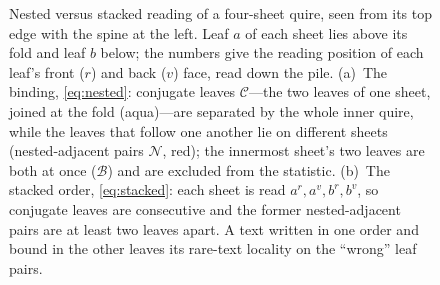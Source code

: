 \documentclass[11pt,a4paper]{article}
\newcommand{\qpitch}{0.6}      %
\newcommand{\qarm}{1.9}        %
\newcommand{\qband}{5pt}       %
\newcommand{\qleaf}[4]{%
  \pgfmathsetmacro{\y}{-#1*\qpitch}
  \pgfmathtruncatemacro{\pv}{#4+1}
  \node[anchor=south,font=\sffamily\tiny,color=ink2,inner sep=0.5pt] at (\qarm-0.16,\y+0.09) {#4};
  \node[anchor=north,font=\sffamily\tiny,color=muted,inner sep=0.5pt] at (\qarm-0.52,\y-0.09) {\pv};
  \node[anchor=west,font=\sffamily\scriptsize,color=black!80] at (\qarm+0.08,\y) {#2$#3$};
  \coordinate (leaf#2#3) at (\qarm+0.55,\y);
}
\newcommand{\qsheet}[3]{%
  \pgfmathsetmacro{\r}{(#1-#2)/2}
  \draw[line width=\qband,#3,line cap=butt] (\qarm,#1) -- (0,#1) arc[start angle=90,end angle=270,radius=\r] -- (\qarm,#2);
}
\newcommand{\qnested}[1]{%
  \foreach \s in {1,...,#1}{
    \pgfmathtruncatemacro{\ia}{\s-1}\pgfmathtruncatemacro{\ib}{2*#1-\s}
    \qsheet{-\ia*\qpitch}{-\ib*\qpitch}{sheet\s}
    \pgfmathtruncatemacro{\pa}{2*\ia+1}\pgfmathtruncatemacro{\pb}{2*\ib+1}
    \qleaf{\ia}{\s}{a}{\pa}\qleaf{\ib}{\s}{b}{\pb}
  }
}
\newcommand{\qstacked}[1]{%
  \foreach \s in {1,...,#1}{
    \pgfmathtruncatemacro{\ia}{2*\s-2}\pgfmathtruncatemacro{\ib}{2*\s-1}
    \qsheet{-\ia*\qpitch}{-\ib*\qpitch}{sheet\s}
    \pgfmathtruncatemacro{\pa}{2*\ia+1}\pgfmathtruncatemacro{\pb}{2*\ib+1}
    \qleaf{\ia}{\s}{a}{\pa}\qleaf{\ib}{\s}{b}{\pb}
  }
}
\newcommand{\qreadarrow}[1]{%
  \pgfmathsetmacro{\yb}{-(#1-1)*\qpitch-0.22}
  \draw[->,muted,>={Stealth[length=3pt]},line width=0.5pt] (\qarm+0.62,0.22) -- (\qarm+0.62,\yb);
  \node[anchor=north west,color=ink2,font=\sffamily\tiny,align=left,inner sep=1pt] at (\qarm+0.5,\yb-0.02) {reading order};
}
\newcommand{\qfoldmark}[2]{%
  \draw[stackedc,line width=1.1pt] (0,#1+#2) arc[start angle=90,end angle=270,radius=#2];
}
\newcommand{\qfoldlabel}[3]{%
  \node[anchor=north west,align=left,font=\sffamily\tiny,color=stackedc!80!black,text width=3.1cm,inner sep=1pt] at (#1,#2) {#3};
}
\newcommand{\qbracket}[6]{%
  \draw[#3,line width=0.9pt] ($(#1)+(#4,0.13)$) -- ($(#1)+(#4+0.12,0.13)$) -- ($(#2)+(#4+0.12,-0.13)$) -- ($(#2)+(#4,-0.13)$);
  \node[anchor=west,align=left,font=\sffamily\tiny,color=#3!80!black,text width=2.35cm,inner sep=1pt] at ($(#1)+(#4+0.2,#5)$) {#6};
}
\newcommand{\qfacecallout}{%
  \draw[muted,line width=0.4pt] (\qarm-1.05,0.36) -- (\qarm-0.45,0.11);
  \node[anchor=east,font=\sffamily\tiny,color=ink2,inner sep=1pt] at (\qarm-1.05,0.36) {front face ($r$)};
  \draw[muted,line width=0.4pt] (\qarm-1.35,-0.3) -- (\qarm-0.8,-0.11);
  \node[anchor=east,font=\sffamily\tiny,color=ink2,inner sep=1pt] at (\qarm-1.35,-0.3) {back face ($v$)};
}
\newcommand{\pv}{p}
\begin{document}
\begin{figure}[tbp]
\centering
{}
\caption{Nested versus stacked reading of a four-sheet quire, seen from its top edge with the spine at the left. Leaf $a$ of each sheet lies above its fold and leaf $b$ below; the numbers give the reading position of each leaf's front ($r$) and back ($v$) face, read down the pile. (a)~The binding, \cref{eq:nested}: conjugate leaves $\mathcal{C}$---the two leaves of one sheet, joined at the fold (aqua)---are separated by the whole inner quire, while the leaves that follow one another lie on different sheets (nested-adjacent pairs $\mathcal{N}$, red); the innermost sheet's two leaves are both at once ($\mathcal{B}$) and are excluded from the statistic. (b)~The stacked order, \cref{eq:stacked}: each sheet is read $a^r,a^v,b^r,b^v$, so conjugate leaves are consecutive and the former nested-adjacent pairs are at least two leaves apart. A text written in one order and bound in the other leaves its rare-text locality on the ``wrong'' leaf pairs.}
\label{fig:codicology}
\end{figure}
\end{document}
